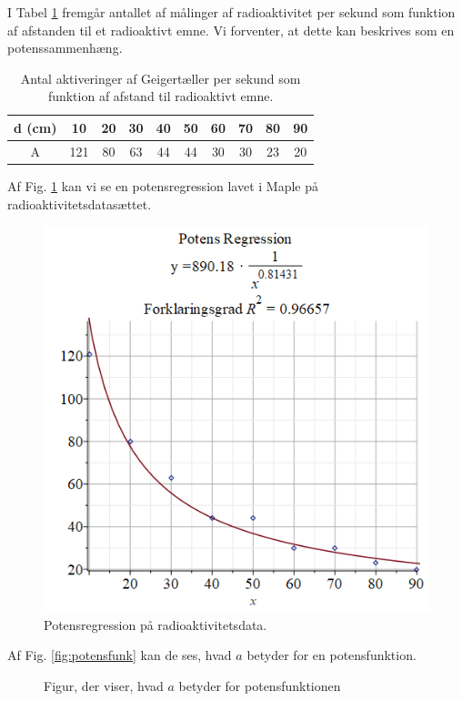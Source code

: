\begin{exa}\label{exa:radio}
I Tabel \ref{tab:radio} fremgår antallet af målinger af radioaktivitet per sekund som funktion af afstanden til et radioaktivt emne. Vi forventer, at dette kan beskrives som en potenssammenhæng. 
\begin{table}[H]
\center
\begin{tabular}{c|c|c|c|c|c|c|c|c|c}
d (cm) & 10 & 20 & 30 & 40 & 50 & 60 & 70 & 80 & 90\\ \hline
A & 121 & 80 & 63 & 44 & 44 & 30 & 30 & 23 & 20 
\end{tabular}
\caption{Antal aktiveringer af Geigertæller per sekund som funktion af afstand til radioaktivt emne.}
\label{tab:radio}
\end{table}
Af Fig. \ref{fig:potensreg} kan vi se en potensregression lavet i Maple på radioaktivitetsdatasættet. 
\begin{figure}[H]
\includegraphics[width=\textwidth]{Billeder/potensreg.png}
\caption{Potensregression på radioaktivitetsdata.}
\label{fig:potensreg}
\end{figure}
\end{exa}
Af Fig. \ref{fig:potensfunk} kan de ses, hvad $a$ betyder for en potensfunktion.
\begin{figure}[H]
\centering
{}
\caption{Figur, der viser, hvad $a$ betyder for potensfunktionen}
\end{figure}

